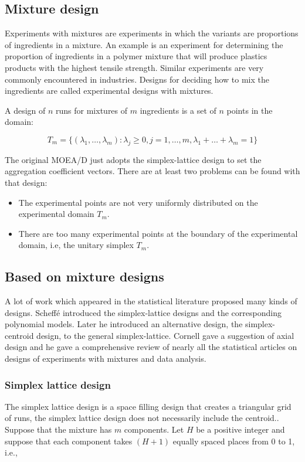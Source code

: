 \documentclass[a4paper,10pt]{llncs}
\begin{document}
\subsection{Mixture design}

Experiments with mixtures are experiments in which the variants are proportions of ingredients in a mixture. An example is an experiment for determining the proportion of ingredients in a polymer mixture that will produce plastics products with the
highest tensile strength. Similar experiments are very commonly encountered in industries. Designs for deciding how to mix the ingredients are called experimental designs with mixtures.

A design of $n$ runs for mixtures of $m$ ingredients is a set of $n$ points in the domain:

\begin{equation}
T_m = \{ ( \lambda_1, \dots, \lambda_m ):\lambda_j \geq 0, j=1, \dots,m, \lambda_1 + \dots + \lambda_m  = 1 \}
\end{equation}

The original MOEA/D\cite{4358754} just adopts the simplex-lattice design to set the aggregation coefficient vectors. There are at least two problems can be found with that design:
\begin{itemize}
 \item The experimental points are not very uniformly distributed on the experimental domain $T_m$.
 \item There are too many experimental points at the boundary of the experimental domain, i.e, the unitary simplex $T_m$.
\end{itemize}

\subsection{Based on mixture designs}

A lot of work which appeared in the statistical literature proposed many kinds of designs. Scheff\'e introduced the simplex-lattice designs and the corresponding
polynomial models\cite{scheffe1958experiments}. Later he introduced an alternative design, the simplex-centroid design, to the general simplex-lattice. Cornell gave a suggestion of axial design and
he gave a comprehensive review of nearly all the statistical articles on designs of experiments with mixtures and data analysis\cite{cornell2011experiments}. 

\subsubsection{Simplex lattice design }
The simplex lattice design is a space filling design that creates a triangular grid of runs, the simplex lattice design does not necessarily include the centroid.. Suppose that the mixture has $m$ components. Let $H$ be a positive integer and suppose that each component takes $(H+1)$ equally spaced places from 0 to 1, i.e.,
\end{document}

